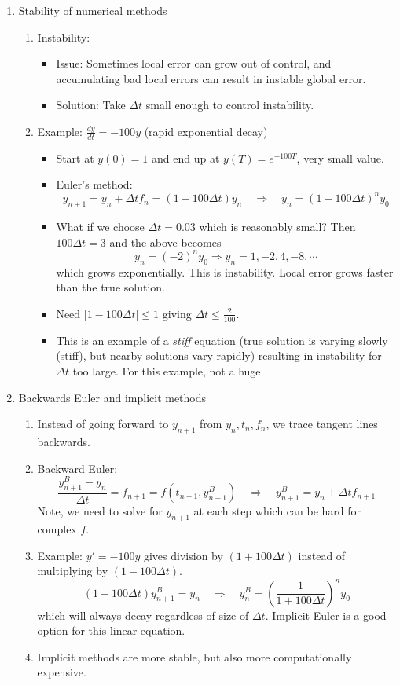 \documentclass{article}
\newcommand{\ds}{\displaystyle}
\begin{document}
\begin{enumerate}
\item Stability of numerical methods
\begin{enumerate}
\item Instability:
\begin{itemize}
\item Issue: Sometimes local error can grow out of control, and accumulating bad local errors can result in instable global error. 
\item Solution: Take $\Delta t$ small enough to control instability.
\end{itemize}

\item Example: $\ds \frac{dy}{dt} = -100y$ (rapid exponential decay)
\begin{itemize}
\item Start at $y(0)=1$ and end up at $y(T)=e^{-100T}$, very small value.
\item Euler's method:
\[
y_{n+1} = y_n + \Delta t f_n = (1 - 100\Delta t)y_n \quad \Rightarrow \quad y_n = (1-100\Delta t)^ny_0
\]
\item What if we choose $\Delta t = 0.03$ which is reasonably small? Then $100 \Delta t=3$ and the above becomes
\[
y_n = (-2)^ny_0 \Rightarrow y_n = 1,-2,4,-8,\cdots
\]
which grows exponentially. This is instability. Local error grows faster than the true solution.
\item Need $|1-100 \Delta t|\leq 1$ giving $\Delta t \leq \frac{2}{100}$.
\item This is an example of a \emph{stiff} equation (true solution is varying slowly (stiff), but nearby solutions vary rapidly) resulting in instability for $\Delta t$ too large. For this example, not a huge 
\end{itemize}
\end{enumerate}

\item Backwards Euler and implicit methods
\begin{enumerate}
\item Instead of going forward to $y_{n+1}$ from $y_n, t_n, f_n$, we trace tangent lines backwards.
\item Backward Euler:
\[
\frac{y_{n+1}^B-y_n}{\Delta t} = f_{n+1}=f(t_{n+1},y_{n+1}^B) \quad \Rightarrow \quad
y_{n+1}^B = y_n+\Delta t f_{n+1}
\]
Note, we need to solve for $y_{n+1}$ at each step which can be hard for complex $f$.
\item Example: $y'=-100y$ gives division by $(1+100\Delta t)$ instead of multiplying by $(1-100\Delta t)$.
\[
(1+100\Delta t)y_{n+1}^B = y_n \quad \Rightarrow \quad 
y_{n}^B = \left(\frac{1}{1+100\Delta t}\right)^ny_0
\]
which will always decay regardless of size of $\Delta t$. Implicit Euler is a good option for this linear equation.
\item Implicit methods are more stable, but also more computationally expensive. 
\end{enumerate}


\end{enumerate}
\end{document}
